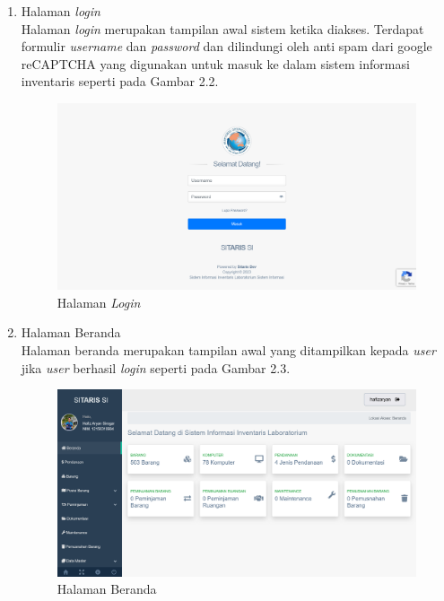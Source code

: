 \begin{enumerate}
  \item Halaman \textit{login} \\ Halaman \textit{login} merupakan tampilan awal sistem ketika diakses. Terdapat formulir \textit{username} dan \textit{password} dan dilindungi oleh anti spam dari google reCAPTCHA yang digunakan untuk masuk ke dalam sistem informasi inventaris seperti pada Gambar 2.2.

        \begin{figure}
          \centering
          \includegraphics[width=0.82\linewidth]{konten//gambar/Login Page.png}
          \caption{Halaman \textit{Login}}
          \label{fig:enter-label}
        \end{figure}


  \item Halaman Beranda \\ Halaman beranda merupakan tampilan awal yang ditampilkan kepada \textit{user} jika \textit{user} berhasil \textit{login} seperti pada Gambar 2.3.

        \begin{figure}
          \centering
          \includegraphics[width=0.82\linewidth]{konten//gambar/login berhasil.png}
          \caption{Halaman Beranda}
          \label{fig:enter-label}
        \end{figure}


\end{enumerate}
